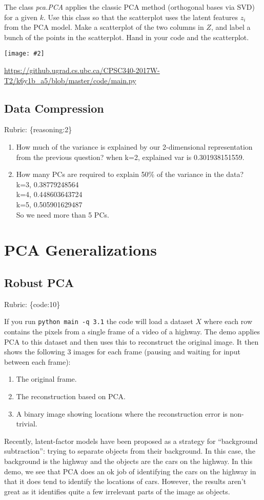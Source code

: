 \documentclass{article}
\def\rubric#1{\gre{Rubric: \{#1\}}}{}
\def\blu#1{{\color{blu}#1}}
\def\gre#1{{\color{gre}#1}}
\newcommand{\centerfig}[2]{\begin{center}\texttt{[image: \#2]}\end{center}}
\def\enum#1{\begin{enumerate}#1\end{enumerate}}
\begin{document}
The class \emph{pca.PCA} applies the classic PCA method (orthogonal bases via SVD) for a given $k$.
Use this class so that the scatterplot uses the latent features $z_i$ from the PCA model.
Make a scatterplot of the two columns in $Z$, and label a bunch of the points in the scatterplot. \blu{Hand in your code and the scatterplot}.
\centerfig{.5}{../figs/2.2.png}
\gre{\url{https://github.ugrad.cs.ubc.ca/CPSC340-2017W-T2/k6y1b_a5/blob/master/code/main.py}}

\subsection{Data Compression}
\rubric{reasoning:2}

\blu{\enum{
\item How much of the variance is explained by our 2-dimensional representation from the previous question?
\gre{when k=2, explained var is 0.301938151559.}
\item How many PCs are required to explain 50\% of the variance in the data?
\gre{\\
	k=3, 0.38779248564\\
	k=4, 0.448603643724\\
	k=5, 0.505901629487\\ So we need more than 5 PCs.}
}}

\section{PCA Generalizations}

\subsection{Robust PCA}
\rubric{code:10}

If you run \verb|python main -q 3.1| the code will load a dataset $X$ where each row contains the pixels from a single frame of a video of a highway. The demo applies PCA to this dataset and then uses this to reconstruct the original image.
It then shows the following 3 images for each frame (pausing and waiting for input between each frame):
\enum{
\item The original frame.
\item The reconstruction based on PCA.
\item A binary image showing locations where the reconstruction error is non-trivial.
}
Recently, latent-factor models have been proposed as a strategy for ``background subtraction'': trying to separate objects from their background. In this case, the background is the highway and the objects are the cars on the highway. In this demo, we see that PCA does an ok job of identifying the cars on the highway in that it does tend to identify the locations of cars. However, the results aren't great as it identifies quite a few irrelevant parts of the image as objects.
\end{document}
